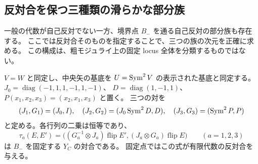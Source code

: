 \subsection{反対合を保つ三種類の滑らかな部分族}
\label{subsec:fixed-opposite-families-v23}

一般の代数が自己反対でない一方、境界点 $B_-$ を通る自己反対の部分族も存在する。
ここでは反対合そのものを指定することで、三つの族の次元を正確に求める。
この構成は、粗モジュライ上の固定 locus 全体を分類するものではない。

$V=W$ と同定し、中央矢の基底を $U=\operatorname{Sym}^2V$ の表示された基底と同定する。
$J_0=\operatorname{diag}(-1,1,1,-1,1,-1)$、
$D=\operatorname{diag}(1,-1,1)$、$P(x_1,x_2,x_3)=(x_2,x_1,x_3)$ と置く。
三つの対を
\[
 (J_1,G_1)=(J_0,I),\quad
 (J_2,G_2)=(J_0\operatorname{Sym}^2D,D),\quad
 (J_3,G_3)=(\operatorname{Sym}^2P,P)
\]
と定める。各行列の二乗は恒等であり、
\begin{equation}\label{eq:fixed-opposite-involutions-v23}
 \tau_a(E,E')=
 \bigl((G_a^{-1}\otimes J_a)\operatorname{flip}E',
       (J_a\otimes G_a)\operatorname{flip}E\bigr)
 \qquad(a=1,2,3)
\end{equation}
は $B_-$ を固定する $Y_C$ の対合である。
固定点ではこの式が有限代数の反対合を与える。

